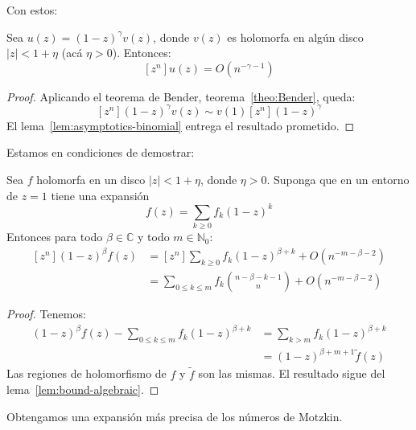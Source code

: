   Con estos:
  \begin{lemma}
    \label{lem:bound-algebraic}
    Sea \(u(z) = (1 - z)^\gamma v(z)\),
    donde \(v(z)\) es holomorfa
    en algún disco \(\lvert z \rvert < 1 + \eta\)
    (acá \(\eta > 0\)).
    Entonces:
    \begin{equation*}
      \left[ z^n \right] u(z)
	= O(n^{-\gamma - 1})
    \end{equation*}
  \end{lemma}
  \begin{proof}
    Aplicando el teorema de Bender,%
    teorema~\ref{theo:Bender},
    queda:
    \begin{equation*}
      \left[ z^n \right] (1 - z)^\gamma v(z)
	\sim v(1) \left[ z^n \right] (1 - z)^\gamma
    \end{equation*}
    El lema~\ref{lem:asymptotics-binomial}
    entrega el resultado prometido.
  \end{proof}
  Estamos en condiciones de demostrar:
  \begin{theorem}
    \label{theo:Darboux-lemma}
    Sea \(f\) holomorfa en un disco \(\lvert z \rvert < 1 + \eta\),
    donde \(\eta > 0\).
    Suponga que en un entorno de \(z = 1\) tiene una expansión
    \begin{equation*}
      f(z)
	= \sum_{k \ge 0} f_k (1 - z)^k
    \end{equation*}
    Entonces para todo \(\beta \in \mathbb{C}\)
    y todo \(m \in \mathbb{N}_0\):
    \begin{align*}
      \left[ z^n \right] (1 - z)^\beta f(z)
	&= \left[ z^n \right] \sum_{k \ge 0} f_k (1 - z)^{\beta + k}
	     + O(n^{-m - \beta - 2}) \\
	&= \sum_{0 \le k \le m} f_k \binom{n -\beta - k - 1}{n}
	     + O(n^{-m - \beta - 2})
    \end{align*}
  \end{theorem}
  \begin{proof}
    Tenemos:
    \begin{align*}
      (1 - z)^\beta f(z)
	- \sum_{0 \le k \le m} f_k (1 - z)^{\beta + k}
	&= \sum_{k > m} f_k (1 - z)^{\beta + k} \\
	&= (1 - z)^{\beta + m + 1} \widetilde{f}(z)
    \end{align*}
    Las regiones de holomorfismo
    de \(f\) y \(\widetilde{f}\) son las mismas.
    El resultado sigue del lema~\ref{lem:bound-algebraic}.
  \end{proof}
  Obtengamos una expansión más precisa de los números de Motzkin.%
